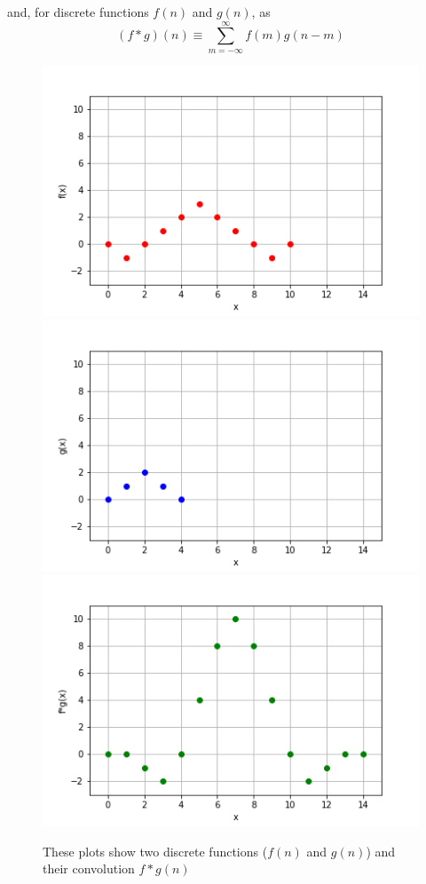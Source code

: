 \FloatBarrier
and, for discrete functions $f(n)$ and $g(n)$, as
\begin{equation}
(f * g)(n)\equiv\sum_{m=-\infty}^{\infty}f(m) g(n-m)
\end{equation}
\begin{figure}[h]
    \includegraphics[width=.32\linewidth]{graphics/convolution/convolution_discrete_f_gebs.png}
    \includegraphics[width=.32\linewidth]{graphics/convolution/convolution_discrete_g_gebs.png}
    \includegraphics[width=.32\linewidth]{graphics/convolution/convolution_discrete_fg_gebs.png}
    \caption{These plots show two discrete functions ($f(n)$ and $g(n)$) and their convolution $f*g(n)$}
    \label{fig:discreteconvolution}
\end{figure}
\FloatBarrier
